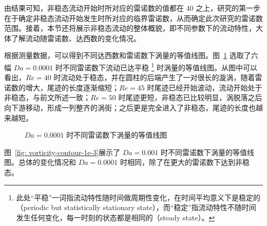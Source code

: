 由结果可知，非稳态流动开始时所对应的雷诺数的值都在 40 之上，研究的第一步在于确定非稳态流动开始发生时所对应的临界雷诺数，从而确定此次研究的雷诺数范围。接着，本节还将展示非稳态流动的整体概貌，即不同参数下的流动特性，大体了解流动随雷诺数、达西数的变化情况。

根据测量数据，可以得到不同达西数和雷诺数下涡量的等值线图。图~\ref{fig: vorticity-contour-1e-4} 选取了六幅 $Da=0.0001$ 时不同雷诺数下流动已达平稳 \footnote{此处“平稳”一词指流动特性随时间做周期性变化，在时间平均意义下是稳定的（periodic but statistically stationary state），而“稳定”指流动特性不随时间发生任何变化，每一时刻的状态都是相同的（steady state）。} 时涡量的等值线图。从图中可以看出，$Re=40$ 时流动处于稳态，并在圆柱的后端产生了一对很长的漩涡，随着雷诺数的增大，尾迹的长度逐渐缩短；$Re=45$ 时尾迹已经开始波动，流动开始处于非稳态，与前文所述一致；$Re=50$ 时尾迹更短，非稳态已比较明显，涡脱落之后向下游移动，形成一列整齐的涡街；之后更是完全进入了非稳态，尾迹的长度也越来越短。

\begin{figure}
	\centering
	\begin{minipage}{\textwidth}
		\centering
	\end{minipage}
	\centering
	\begin{minipage}{\textwidth}
		\centering
	\end{minipage}
	\centering
	\begin{minipage}{\textwidth}
		\centering
	\end{minipage}
	\caption{$Da=0.0001$ 时不同雷诺数下涡量的等值线图}
	\label{fig: vorticity-contour-1e-4}
\end{figure}

图~\ref{fig: vorticity-contour-1e-3}展示了 $Da=0.001$ 时不同雷诺数下涡量的等值线图。总体的变化情况和 $Da=0.0001$ 时相同，除了在更大的雷诺数下达到非稳态。

